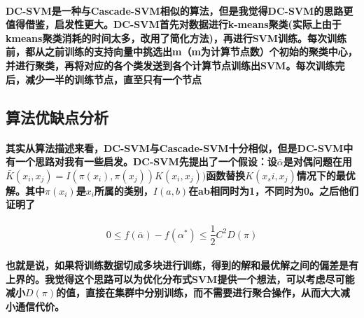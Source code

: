 \documentclass[UTF8]{ctexart}
\begin{document}
\paragraph{
    DC-SVM是一种与Cascade-SVM相似的算法，但是我觉得DC-SVM的思路更值得借鉴，启发性更大。DC-SVM首先对数据进行k-means聚类(实际上由于kmeans聚类消耗的时间太多，改用了简化方法)，再进行SVM训练。每次训练前，都从之前训练的支持向量中挑选出m（m为计算节点数）个初始的聚类中心，并进行聚类，再将对应的各个类发送到各个计算节点训练出SVM。每次训练完后，减少一半的训练节点，直至只有一个节点
}
\subsection{算法优缺点分析}
\paragraph{
    其实从算法描述来看，DC-SVM与Cascade-SVM十分相似，但是DC-SVM中有一个思路对我有一些启发。DC-SVM先提出了一个假设：设$\bar{\alpha}$是对偶问题在用$\bar{K}(x_i,x_j)=I(\pi(x_i),\pi(x_j))K(x_i,x_j))$函数替换$K(x_si,x_j)$情况下的最优解。其中$\pi(x_i)$是$x_i$所属的类别，$I(a,b)$在ab相同时为1，不同时为0。之后他们证明了
}
\[0 \leq f(\bar{\alpha})-f(\alpha^*) \leq \frac{1}{2}C^2D(\pi)\]
\paragraph{
    也就是说，如果将训练数据切成多块进行训练，得到的解和最优解之间的偏差是有上界的。我觉得这个思路可以为优化分布式SVM提供一个想法，可以考虑尽可能减小$D(\pi)$的值，直接在集群中分别训练，而不需要进行聚合操作，从而大大减小通信代价。
}
\end{document}
